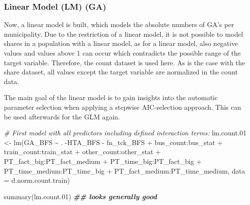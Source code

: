 \documentclass[
]{article}
\newenvironment{Shaded}{\begin{snugshade}}{\end{snugshade}}
\newcommand{\AttributeTok}[1]{\textcolor[rgb]{0.77,0.63,0.00}{#1}}
\newcommand{\CommentTok}[1]{\textcolor[rgb]{0.56,0.35,0.01}{\textit{#1}}}
\newcommand{\DocumentationTok}[1]{\textcolor[rgb]{0.56,0.35,0.01}{\textbf{\textit{#1}}}}
\newcommand{\FloatTok}[1]{\textcolor[rgb]{0.00,0.00,0.81}{#1}}
\newcommand{\FunctionTok}[1]{\textcolor[rgb]{0.00,0.00,0.00}{#1}}
\newcommand{\NormalTok}[1]{#1}
\newcommand{\OtherTok}[1]{\textcolor[rgb]{0.56,0.35,0.01}{#1}}
\newcommand{\SpecialCharTok}[1]{\textcolor[rgb]{0.00,0.00,0.00}{#1}}
\begin{document}
\hypertarget{linear-model-lm-ga}{%
\subsubsection{Linear Model (LM) (GA)}\label{linear-model-lm-ga}}

Now, a linear model is built, which models the absolute numbers of GA's
per municipality. Due to the restriction of a linear model, it is not
possible to model shares in a population with a linear model, as for a
linear model, also negative values and values above 1 can occur which
contradicts the possible range of the target variable. Therefore, the
count dataset is used here. As is the case with the share dataset, all
values except the target variable are normalized in the count data.

The main goal of the linear model is to gain insights into the automatic
parameter selection when applying a stepwise AIC-selection approach.
This can be used afterwards for the GLM again.

\begin{Shaded}
\begin{Highlighting}[]
\CommentTok{\# First model with all predictors including defined interaction terms:}
\NormalTok{lm.count}\FloatTok{.01} \OtherTok{\textless{}{-}} \FunctionTok{lm}\NormalTok{(GA\_BFS }\SpecialCharTok{\textasciitilde{}}\NormalTok{ . }\SpecialCharTok{{-}}\NormalTok{HTA\_BFS }\SpecialCharTok{{-}}\NormalTok{ fn\_tck\_BFS }
                    \SpecialCharTok{+}\NormalTok{ bus\_count}\SpecialCharTok{:}\NormalTok{bus\_stat}
                    \SpecialCharTok{+}\NormalTok{ train\_count}\SpecialCharTok{:}\NormalTok{train\_stat}
                    \SpecialCharTok{+}\NormalTok{ other\_count}\SpecialCharTok{:}\NormalTok{other\_stat}
                    \SpecialCharTok{+}\NormalTok{ PT\_fact\_big}\SpecialCharTok{:}\NormalTok{PT\_fact\_medium}
                    \SpecialCharTok{+}\NormalTok{ PT\_time\_big}\SpecialCharTok{:}\NormalTok{PT\_fact\_big}
                    \SpecialCharTok{+}\NormalTok{ PT\_time\_medium}\SpecialCharTok{:}\NormalTok{PT\_time\_big}
                    \SpecialCharTok{+}\NormalTok{ PT\_fact\_medium}\SpecialCharTok{:}\NormalTok{PT\_time\_medium,}
                  \AttributeTok{data =}\NormalTok{ d.norm.count.train)}

\FunctionTok{summary}\NormalTok{(lm.count}\FloatTok{.01}\NormalTok{) }\DocumentationTok{\#\# looks generally good}
\end{Highlighting}
\end{Shaded}
\end{document}
